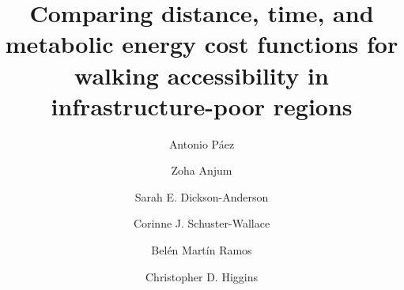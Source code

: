 \documentclass[]{elsarticle} %
\begin{document}
\begin{frontmatter}

  \title{Comparing distance, time, and metabolic energy cost functions for
walking accessibility in infrastructure-poor regions}
    \author[School of Geography and Earth Sciences]{Antonio Páez}
    \author[Department Health Research Methods Evidence and Impact]{Zoha Anjum}
  
    \author[Department of Civil Engineering]{Sarah E. Dickson-Anderson}
  
    \author[Geography and Planning]{Corinne J. Schuster-Wallace}
  
    \author[Universidad Politécnica de Madrid]{Belén Martín Ramos}
  
    \author[University of Toronto Scarborough]{Christopher D. Higgins}
  
      \address[School of Geography and Earth Sciences]{School of Geography and Earth Sciences, McMaster University, 1280 Main
St W, Hamilton, ON, L8S 4K1 Canada}
    \address[Department Health Research Methods Evidence and Impact]{Department Health Research Methods Evidence and Impact, McMaster
University, 1280 Main St W, Hamilton, ON, L8S 4K1 Canada}
    \address[Department of Civil Engineering]{Dept. of Civil Engineering, McMaster University, 1280 Main St W,
Hamilton, ON, L8S 4K1 Canada}
    \address[Geography and Planning]{Dept. of Geography and Planning, University of Saskatchewan, Room 265
Arts, 9 Campus Drive, Saskatoon, SK, S7N 5A5 Canada}
    \address[Universidad Politécnica de Madrid]{Transport Research Centre (TRANSyT-UPM), Universidad Politécnica de
Madrid, ETSI de Caminos, Canales y Puertos, Calle Profesor Aranguren
s/n, 28040 Madrid, Spain}
    \address[University of Toronto Scarborough]{Department of Human Geography, Room HL512 1265 Military Trail Toronto,
ON, M1C 1A4 Canada}
  

\end{frontmatter}
\end{document}
